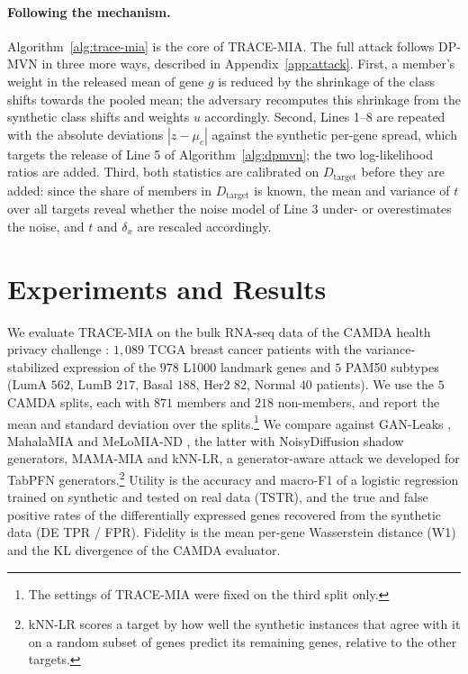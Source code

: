 \documentclass{article}
\newcommand{\dpmvn}{DP-MVN}
\newcommand{\ours}{TRACE-MIA}
\begin{document}
\paragraph{Following the mechanism.}
Algorithm~\ref{alg:trace-mia} is the core of \ours{}. The full attack follows \dpmvn{} in three more ways, described in Appendix~\ref{app:attack}. First, a member's weight in the released mean of gene $g$ is reduced by the shrinkage of the class shifts towards the pooled mean; the adversary recomputes this shrinkage from the synthetic class shifts and weights $u$ accordingly. Second, Lines 1--8 are repeated with the absolute deviations $|z-\mu_c|$ against the synthetic per-gene spread, which targets the release of Line 5 of Algorithm~\ref{alg:dpmvn}; the two log-likelihood ratios are added. Third, both statistics are calibrated on $D_\mathrm{target}$ before they are added: since the share of members in $D_\mathrm{target}$ is known, the mean and variance of $t$ over all targets reveal whether the noise model of Line 3 under- or overestimates the noise, and $t$ and $\delta_x$ are rescaled accordingly.

\section{Experiments and Results}
We evaluate \ours{} on the bulk RNA-seq data of the CAMDA health privacy challenge \cite{menzies2025}: $1{,}089$ TCGA breast cancer patients \cite{weinstein2013tcga} with the variance-stabilized expression \cite{love2014deseq2} of the $978$ L1000 landmark genes \cite{subramanian2017l1000} and $5$ PAM50 subtypes (LumA $562$, LumB $217$, Basal $188$, Her2 $82$, Normal $40$ patients). We use the $5$ CAMDA splits, each with $871$ members and $218$ non-members, and report the mean and standard deviation over the splits.\footnote{The settings of \ours{} were fixed on the third split only.} We compare against GAN-Leaks \cite{chen2020gan}, MahalaMIA and MeLoMIA-ND \cite{golob2026synthetic}, the latter with NoisyDiffusion \cite{kreuer2025noisydiffusion} shadow generators, MAMA-MIA \cite{golob_privacy_2025} and kNN-LR, a generator-aware attack we developed for TabPFN generators.\footnote{kNN-LR scores a target by how well the synthetic instances that agree with it on a random subset of genes predict its remaining genes, relative to the other targets.} Utility is the accuracy and macro-F1 of a logistic regression trained on synthetic and tested on real data (TSTR), and the true and false positive rates of the differentially expressed genes recovered from the synthetic data (DE TPR / FPR). Fidelity is the mean per-gene Wasserstein distance (W1) and the KL divergence of the CAMDA evaluator.
\end{document}
